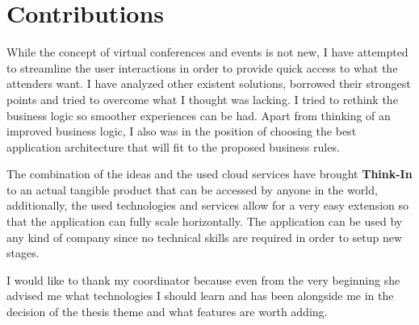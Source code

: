 \chapter*{Contributions} 

While the concept of virtual conferences and events is not new, I have attempted to streamline the user interactions in order to provide quick access to what the attenders want. I have analyzed other existent solutions, borrowed their strongest points and tried to overcome what I thought was lacking. I tried to rethink the business logic so smoother experiences can be had. Apart from thinking of an improved business logic, I also was in the position of choosing the best application architecture that will fit to the proposed business rules.

The combination of the ideas and the used cloud services have brought \textbf{Think-In} to an actual tangible product that can be accessed by anyone in the world, additionally, the used technologies and services allow for a very easy extension so that the application can fully scale horizontally. The application can be used by any kind of company since no technical skills are required in order to setup new stages.

I would like to thank my coordinator \textbf{\coordinator} because even from the very beginning she advised me what technologies I should learn and has been alongside me in the decision of the thesis theme and what features are worth adding.